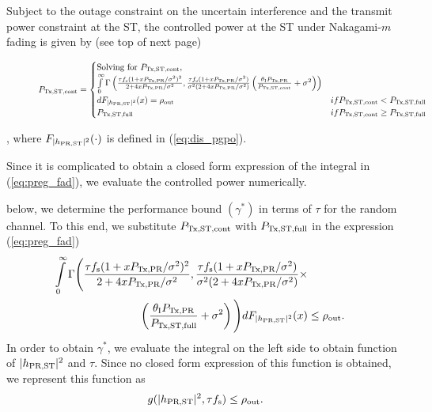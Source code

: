 \begin{lemma} \label{lm:lm6}
\normalfont
Subject to the outage constraint on the uncertain interference and the transmit power constraint at the ST, the controlled power at the ST under Nakagami-$m$ fading is given by (see top of next page)
\begin{figure}
\begin{align}
\preg &=  
\begin{cases} 
\text{Solving for $\preg$, } \\ \int\limits_{0}^{\infty} \Gamma\left(\frac{\tau \fsam (1 + x \ptran/\nps)^2}{2 + 4 x \ptran/\nps}, \frac{\tau \fsam (1 + x \ptran/\nps)}{\nps (2 + 4 x \ptran/\nps)} \left(\frac{\ite\ptran}{\preg} + \nps \right)\right) \\d \fpgpo(x) = \opc & \mbox{if } \preg < \pc \\
\pc & \mbox{if } \preg \ge \pc
\end{cases}
\label{eq:preg_fad} 
\end{align}
\hrulefill
\end{figure}
, where %
$F_{|h_{\text{PR,ST}}|^2}(\cdot)$ is defined in (\ref{eq:dis_pgpo}). 
\end{lemma} 
\begin{IEEEproof}
Since it is complicated to obtain a closed form expression of the integral in (\ref{eq:preg_fad}), we evaluate the controlled power numerically.  
\end{IEEEproof}
 below, we determine the performance bound $(\gamma^*)$ in terms of $\tau$ for the random channel.
To this end, we substitute $P_{\text{Tx,ST,cont}}$ with $P_{\text{Tx,ST,full}}$ in the expression (\ref{eq:preg_fad}) 
\begin{align}
\int\limits_{0}^{\infty} \Gamma\Bigg( \frac{\tau \fsam (1 + x \ptran/\nps)^2}{2 + 4 x \ptran/\nps}, \frac{\tau \fsam (1 + x \ptran/\nps)}{\nps (2 + 4 x \ptran/\nps)} \times \nonumber \\  \left(\frac{\ite\ptran}{\pc} + \nps \right)\Bigg) d \fpgpo(x) &\le \opc. \label{eq:or_fad}
\end{align}
{In order to obtain $\gamma^*$, we evaluate the integral on the left side to obtain function of $|h_{\text{PR,ST}}|^2$ and $\tau$. Since no closed form expression of this function is obtained, we represent this function as}
\begin{align*}
g(|h_{\text{PR,ST}}|^2, \tau f_{\text{s}}) \le \rho_{\text{out}}. \nonumber   
\end{align*}
